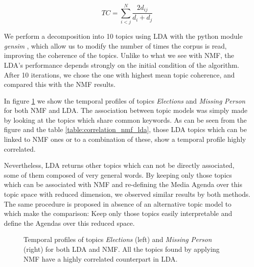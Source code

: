 \documentclass[10pt,letterpaper]{article}
\begin{document}
\begin{equation}
TC = \sum_{i < j}^N \frac{2d_{ij}}{d_i + d_j}
\label{eq:topic_coherence} 
\end{equation}

\par We perform a decomposition into 10 topics using LDA with the python module \emph{gensim} \cite{rehurek_lrec}, which allow us to modify the number of times the corpus is read, improving the coherence of the topics.
Unlike to what we see with NMF, the LDA's performance depends strongly on the initial condition of the algorithm. After 10 iterations, we chose the one with highest mean topic coherence, and compared this with the NMF results.

\par In figure \ref{fig:temporal_profiles_nmf_lda} we show the temporal profiles of topics \emph{Elections} and \emph{Missing Person} for both NMF and LDA. The association between topic models was simply made by looking at the topics which share common keywords.
As can be seen from the figure and the table \ref{table:correlation_nmf_lda}, those LDA topics which can be linked to NMF ones or to a combination of these, show a temporal profile highly correlated. 

\par Nevertheless, LDA returns other topics which can not be directly associated, some of them composed of very general words. 
By keeping only those topics which can be associated with NMF and re-defining the Media Agenda over this topic space with reduced dimension, we observed similar results by both methods.  
The same procedure is proposed in absence of an alternative topic model to which make the comparison: Keep only those topics easily interpretable and define the Agendas over this reduced space.
 
\begin{figure}[h!]
\centering
\caption{Temporal profiles of topics \emph{Elections} (left) and \emph{Missing Person} (right) for both LDA and NMF. All the topics found by applying NMF have a highly correlated counterpart in LDA.} 
\label{fig:temporal_profiles_nmf_lda}
\end{figure}
\end{document}
